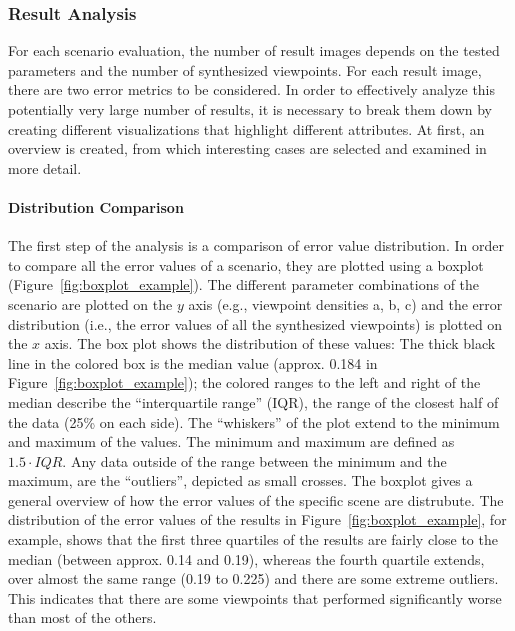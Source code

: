 \subsubsection{Result Analysis}
For each scenario evaluation, the number of result images depends on the tested parameters and the number of synthesized viewpoints. For each result image, there are two error metrics to be considered.
In order to effectively analyze this potentially very large number of results, it is necessary to break them down by creating different visualizations that highlight different attributes. At first, an overview is created, from which interesting cases are selected and examined in more detail.

\paragraph{Distribution Comparison}
The first step of the analysis is a comparison of error value distribution. In order to compare all the error values of a scenario, they are plotted using a boxplot (Figure~\ref{fig:boxplot_example}). The different parameter combinations of the scenario are plotted on the $y$ axis (e.g., viewpoint densities a, b, c) and the error distribution (i.e., the error values of all the synthesized viewpoints) is plotted on the $x$ axis. The box plot shows the distribution of these values: The thick black line in the colored box is the median value (approx. 0.184 in Figure~\ref{fig:boxplot_example}); the colored ranges to the left and right of the median describe the ``interquartile range'' (IQR), the range of the closest half of the data (25\% on each side). The ``whiskers'' of the plot extend to the minimum and maximum of the values. The minimum and maximum are defined as $1.5\cdot IQR$. Any data outside of the range between the minimum and the maximum, are the ``outliers'', depicted as small crosses. The boxplot gives a general overview of how the error values of the specific scene are distrubute. The distribution of the error values of the results in Figure~\ref{fig:boxplot_example}, for example, shows that the first three quartiles of the results are fairly close to the median (between approx. 0.14 and 0.19), whereas the fourth quartile extends, over almost the same range (0.19 to 0.225) and there are some extreme outliers. This indicates that there are some viewpoints that performed significantly worse than most of the others.


